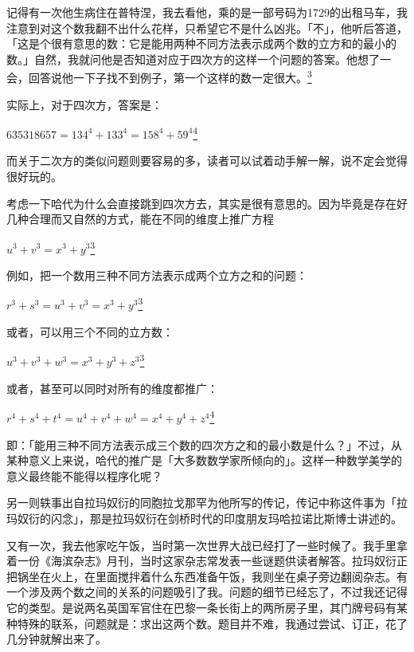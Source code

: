 \documentclass[
  12pt,
  twoside,
  openright,
  oldfontcommands,
]{memoir}
\newenvironment{fsquote}{%
  \begin{mdframed}[style=gebquote]\kaitifamily\small%
}{%
  \end{mdframed}%
}
\begin{document}
\begin{fsquote}
记得有一次他生病住在普特涅，我去看他，乘的是一部号码为1729的出租马车，我注意到对这个数我翻不出什么花样，只希望它不是什么凶兆。「不」，他听后答道，「这是个很有意思的数：它是能用两种不同方法表示成两个数的立方和的最小的数。」自然，我就问他是否知道对应于四次方的这样一个问题的答案。他想了一会，回答说他一下子找不到例子，第一个这样的数一定很大。\hyperref[fn:Chapter17-3]{\textsuperscript{3}}
\end{fsquote}

实际上，对于四次方，答案是：

$635318657=134^4+133^4=158^4+59^4$\hyperref[fn:Chapter17-4]{\textsuperscript{4}}

而关于二次方的类似问题则要容易的多，读者可以试着动手解一解，说不定会觉得很好玩的。

考虑一下哈代为什么会直接跳到四次方去，其实是很有意思的。因为毕竟是存在好几种合理而又自然的方式，能在不同的维度上推广方程

$u^3+v^3=x^3+y^3$\hyperref[fn:Chapter17-3]{\textsuperscript{3}}

例如，把一个数用三种不同方法表示成两个立方之和的问题：

$r^3+s^3=u^3+v^3=x^3+y^3$\hyperref[fn:Chapter17-3]{\textsuperscript{3}}

或者，可以用三个不同的立方数：

$u^3+v^3+w^3=x^3+y^3+z^3$\hyperref[fn:Chapter17-3]{\textsuperscript{3}}

或者，甚至可以同时对所有的维度都推广：

$r^4+s^4+t^4=u^4+v^4+w^4=x^4+y^4+z^4$\hyperref[fn:Chapter17-4]{\textsuperscript{4}}

即：「能用三种不同方法表示成三个数的四次方之和的最小数是什么？」不过，从某种意义上来说，哈代的推广是「大多数数学家所倾向的」。这样一种数学美学的意义最终能不能得以程序化呢？

另一则轶事出自拉玛奴衍的同胞拉戈那罕为他所写的传记，传记中称这件事为「拉玛奴衍的闪念」，那是拉玛奴衍在剑桥时代的印度朋友玛哈拉诺比斯博士讲述的。

\begin{fsquote}
又有一次，我去他家吃午饭，当时第一次世界大战已经打了一些时候了。我手里拿着一份《海滨杂志》月刊，当时这家杂志常发表一些谜题供读者解答。拉玛奴衍正把锅坐在火上，在里面搅拌着什么东西准备午饭，我则坐在桌子旁边翻阅杂志。有一个涉及两个数之间的关系的问题吸引了我。问题的细节已经忘了，不过我还记得它的类型。是说两名英国军官住在巴黎一条长街上的两所房子里，其门牌号码有某种特殊的联系，问题就是：求出这两个数。题目并不难，我通过尝试、订正，花了几分钟就解出来了。
\end{fsquote}
\end{document}
